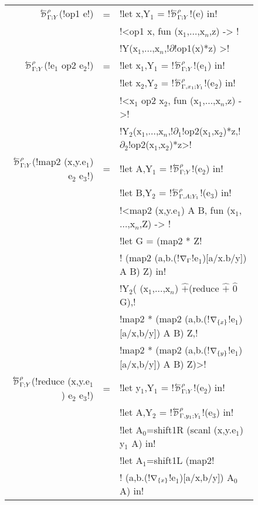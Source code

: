 \begin{figure*}[t]
\begin{tabular}{|r c l|}
        $\directD{\rho}{\Gamma}{Y}$(!op1 e!) &=&  
            !let x,Y$_{1}$ = !$\directD{\rho}{\Gamma}{Y}$!(e) in! \\
            && !<op1 x, fun (x$_{1}$,$\ldots$,x$_n$,z) -> ! \\
            && !Y(x$_{1}$,$\ldots$,x$_n$,!$\partial$!op1(x)*z) >! \\
        $\directD{\rho}{\Gamma}{Y}$(!e$_{1}$ op2 e$_{2}$!) &=& 
            !let x$_{1}$,Y$_{1}$ = !$\directD{\rho}{\Gamma}{Y}$!(e$_{1}$) in! \\
            && !let x$_{2}$,Y$_{2}$ = !$\directD{\rho}{\Gamma,x_1}{Y_1}$!(e$_{2}$) in! \\
            && !<x$_{1}$ op2 x$_{2}$, fun (x$_{1}$,$\ldots$,x$_n$,z) ->! \\
            && !Y$_{2}$(x$_{1}$,$\ldots$,x$_n$,!$\partial_1$!op2(x$_{1}$,x$_{2}$)*z,!$\partial_2$!op2(x$_{1}$,x$_{2}$)*z>! \\
        $\directD{\rho}{\Gamma}{Y}$(!map2 (x,y.e$_{1}$) e$_{2}$ e$_{3}$!) &=&  
            !let A,Y$_{1}$ = !$\directD{\rho}{\Gamma}{Y}$!(e$_{2}$) in! \\
            && !let B,Y$_{2}$ = !$\directD{\rho}{\Gamma,A}{Y_1}$!(e$_{3}$) in! \\
            && !<map2 (x,y.e$_{1}$) A B, fun (x$_{1}$,$\ldots$,x$_n$,Z) -> !\\
            && !let G = (map2 * Z!\\
            && !  (map2 (a,b.(!$\nabla_\Gamma$!e$_{1}$)[a/x.b/y]) A B) Z) in! \\
            && !Y$_{2}$( (x$_{1}$,$\ldots$,x$_n$) $\widehat{+}$(reduce $\widehat{+}$ $\widehat{0}$ G),!\\
            && !map2 * (map2 (a,b.(!$\nabla_{\{x\}}$!e$_{1}$)[a/x,b/y]) A B) Z,!\\
            && !map2 * (map2 (a,b.(!$\nabla_{\{y\}}$!e$_{1}$)[a/x,b/y]) A B) Z)>!\\
        $\directD{\rho}{\Gamma}{Y}$(!reduce (x,y.e$_{1}$) e$_{2}$ e$_{3}$!) &=&
            !let y$_{1}$,Y$_{1}$ = !$\directD{\rho}{\Gamma}{Y}$!(e$_{2}$) in! \\
            && !let A,Y$_{2}$ = !$\directD{\rho}{\Gamma,y_1}{Y_1}$!(e$_{3}$) in! \\
            && !let A$_{0}$=shift1R (scanl (x,y.e$_{1}$) y$_{1}$ A) in! \\
            && !let A$_{1}$=shift1L (map2! \\
            && !   (a,b.(!$\nabla_{\{x\}}$!e$_{1}$)[a/x,b/y]) A$_{0}$ A) in! \\

\end{tabular}
\end{figure*}
